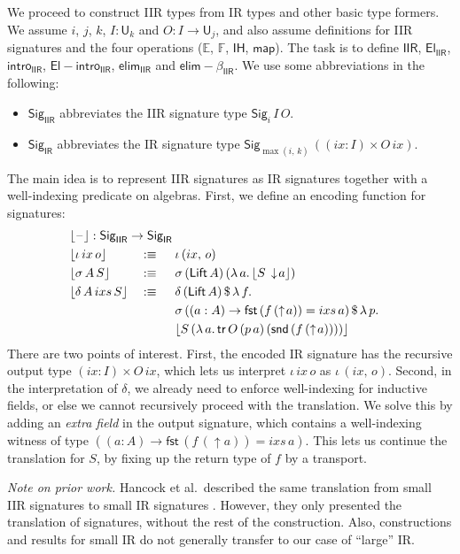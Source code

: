 \documentclass[acmsmall,screen,review]{acmart}
\newcommand{\msf}[1]{{\mathsf{#1}}}
\newcommand{\mbb}[1]{\mathbb{#1}}
\newcommand{\U}{\msf{U}}
\newcommand{\El}{\msf{El}}
\newcommand{\Lift}{\msf{Lift}}
\newcommand{\lup}{\uparrow}
\newcommand{\ldown}{\downarrow}
\newcommand{\Sig}{\msf{Sig}}
\newcommand{\blank}{{\mathord{\hspace{1pt}\text{--}\hspace{1pt}}}}
\newcommand{\ix}{{ix}}
\newcommand{\ixs}{{ixs}}
\newcommand{\IR}{\msf{IR}}
\newcommand{\intro}{\msf{intro}}
\newcommand{\IH}{\msf{IH}}
\newcommand{\map}{\msf{map}}
\newcommand{\elim}{\msf{elim}}
\newcommand{\tr}{\msf{tr}}
\newcommand{\fst}{\msf{fst}}
\newcommand{\snd}{\msf{snd}}
\newcommand{\IIR}{\msf{IIR}}
\newcommand{\Sigr}[1]{\lfloor #1 \rfloor}
\newcommand{\Elintro}{\msf{El\!\!-\!\!intro}}
\newcommand{\E}{\mbb{E}}
\newcommand{\F}{\mbb{F}}
\begin{document}
We proceed to construct IIR types from IR types and other basic type formers. We assume $i$, $j$,
$k$, $I : \U_k$ and $O : I \to \U_j$, and also assume definitions for IIR signatures and the four
operations ($\E$, $\F$, $\IH$, $\map$). The task is to define $\IIR$, $\El_{\IIR}$, $\intro_\IIR$,
$\Elintro_\IIR$, $\elim_{\IIR}$ and $\elim\!\!-\!\!\beta_{\IIR}$. We use some abbreviations in the following:
\begin{itemize}
\item $\Sig_\IIR$ abbreviates the IIR signature type $\Sig_i\,I\,O$.
\item $\Sig_\IR$ abbreviates the IR signature type $\Sig_{\max(i,\,k)}\,((\ix : I) \times O\,\ix)$.
\end{itemize}
The main idea is to represent IIR signatures as IR signatures together with a
well-indexing predicate on algebras. First, we define an encoding function for signatures:
\begin{alignat*}{4}
  & \rlap{$\Sigr{\blank} : \Sig_\IIR \to \Sig_\IR$}\\
  & \Sigr{\iota\,\ix\,o}      &&:\equiv \hspace{0.5em} &&\iota\,(\ix,\,o)\\
  & \Sigr{\sigma\,A\,S}       &&:\equiv \hspace{0.5em} &&\sigma\,(\Lift\,A)\,(\lambda\,a.\,\Sigr{S\,\ldown\!a})\\
  & \Sigr{\delta\,A\,\ixs\,S} &&:\equiv \hspace{0.5em} &&\delta\,(\Lift\,A)\,\$\,\lambda\,f.\\
  &  &&                                &&\sigma\,((a : A) \to \fst\,(f\,(\lup\!a)) = \ixs\,a)\,\$\,\lambda\,p.\\
  &  &&                                &&\Sigr{S\,(\lambda\,a.\,\tr\,O\,(p\,a)\,(\snd\,(f\,(\lup\! a))))}
\end{alignat*}
There are two points of interest. First, the encoded IR signature has the recursive output type $(\ix
: I) \times O\,\ix$, which lets us interpret $\iota\,\ix\,o$ as $\iota\,(\ix,\,o)$. Second, in the
interpretation of $\delta$, we already need to enforce well-indexing for inductive fields, or else
we cannot recursively proceed with the translation. We solve this by adding an \emph{extra field} in
the output signature, which contains a well-indexing witness of type $((a : A) \to \fst\,(f\,(\lup\!a)) = \ixs\,a)$.
This lets us continue the translation for $S$, by fixing up the return type of $f$ by a transport.

\emph{Note on prior work.} Hancock et al.\ described the same translation from small IIR signatures
to small IR signatures \cite[Section~6]{DBLP:conf/tlca/HancockMGMA13}. However, they only presented
the translation of signatures, without the rest of the construction. Also, constructions and results
for small IR do not generally transfer to our case of ``large'' IR.
\end{document}
